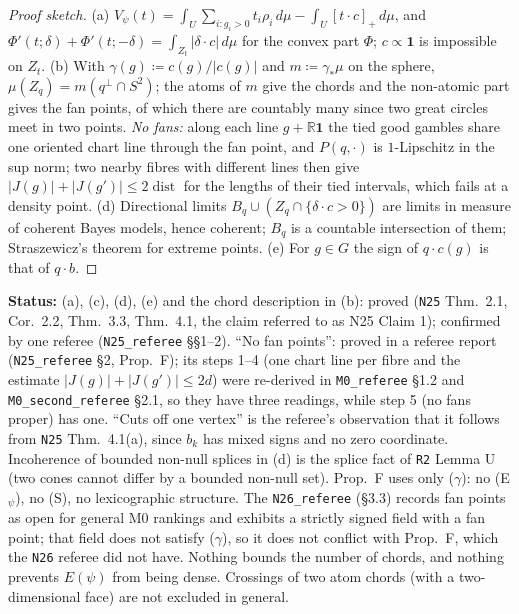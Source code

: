 \documentclass[11pt]{article}
\theoremstyle{definition}
\theoremstyle{remark}
\newcommand{\R}{\mathbb R}
\newcommand{\one}{\mathbf 1}
\newcommand{\src}[1]{\texttt{#1}}
\newcommand{\status}[1]{\par\smallskip\noindent\textbf{Status:} #1\par\smallskip}
\begin{document}
\begin{proof}[Proof sketch]
(a) $V_\psi(t)=\int_U\sum_{i:g_i>0}t_i\rho_i\,d\mu-\int_U[t\cdot c]_+\,d\mu$, and $\Phi'(t;\delta)+\Phi'(t;-\delta)=\int_{Z_t}|\delta\cdot c|\,d\mu$ for the convex part $\Phi$; $c\propto\one$ is impossible on $Z_t$. (b) With $\gamma(g)\coloneqq c(g)/|c(g)|$ and $m\coloneqq\gamma_*\mu$ on the sphere, $\mu(Z_q)=m(q^\perp\cap S^2)$; the atoms of $m$ give the chords and the non-atomic part gives the fan points, of which there are countably many since two great circles meet in two points. \emph{No fans:} along each line $g+\R\one$ the tied good gambles share one oriented chart line through the fan point, and $P(q,\cdot)$ is $1$-Lipschitz in the sup norm; two nearby fibres with different lines then give $|J(g)|+|J(g')|\le2\operatorname{dist}$ for the lengths of their tied intervals, which fails at a density point. (d) Directional limits $B_q\cup(Z_q\cap\{\delta\cdot c>0\})$ are limits in measure of coherent Bayes models, hence coherent; $B_q$ is a countable intersection of them; Straszewicz's theorem for extreme points. (e) For $g\in G$ the sign of $q\cdot c(g)$ is that of $q\cdot b$.
\end{proof}
\status{(a), (c), (d), (e) and the chord description in (b): proved (\src{N25} Thm.~2.1, Cor.~2.2, Thm.~3.3, Thm.~4.1, the claim referred to as N25 Claim 1); confirmed by one referee (\src{N25\_referee} \S\S1--2). ``No fan points'': proved in a referee report (\src{N25\_referee} \S2, Prop.~F); its steps 1--4 (one chart line per fibre and the estimate $|J(g)|+|J(g')|\le2d$) were re-derived in \src{M0\_referee} \S1.2 and \src{M0\_second\_referee} \S2.1, so they have three readings, while step 5 (no fans proper) has one. ``Cuts off one vertex'' is the referee's observation that it follows from \src{N25} Thm.~4.1(a), since $b_k$ has mixed signs and no zero coordinate. Incoherence of bounded non-null splices in (d) is the splice fact of \src{R2} Lemma U (two cones cannot differ by a bounded non-null set). Prop.~F uses only ($\gamma$): no (E$_\psi$), no (S), no lexicographic structure. The \src{N26\_referee} (\S3.3) records fan points as open for general M0 rankings and exhibits a strictly signed field with a fan point; that field does not satisfy ($\gamma$), so it does not conflict with Prop.~F, which the \src{N26} referee did not have. Nothing bounds the number of chords, and nothing prevents $E(\psi)$ from being dense. Crossings of two atom chords (with a two-dimensional face) are not excluded in general.}
\end{document}
